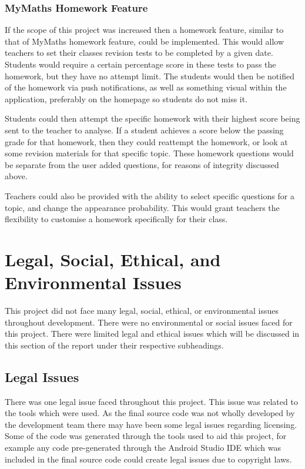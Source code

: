 \documentclass{article}
\begin{document}
\subsubsection{MyMaths Homework Feature}

If the scope of this project was increased then a homework feature, similar to that of MyMaths homework feature, could be implemented. This would allow teachers to set their classes revision tests to be completed by a given date. Students would require a certain percentage score in these tests to pass the homework, but they have no attempt limit. The students would then be notified of the homework via push notifications, as well as something visual within the application, preferably on the homepage so students do not miss it. \par

Students could then attempt the specific homework with their highest score being sent to the teacher to analyse. If a student achieves a score below the passing grade for that homework, then they could reattempt the homework, or look at some revision materials for that specific topic. These homework questions would be separate from the user added questions, for reasons of integrity discussed above. \par

Teachers could also be provided with the ability to select specific questions for a topic, and change the appearance probability. This would grant teachers the flexibility to customise a homework specifically for their class. \par

\section{Legal, Social, Ethical, and Environmental Issues}
\label{section:issues}

This project did not face many legal, social, ethical, or environmental issues throughout development. There were no environmental or social issues faced for this project. There were limited legal and ethical issues which will be discussed in this section of the report under their respective subheadings. 

\subsection{Legal Issues}

There was one legal issue faced throughout this project. This issue was related to the tools which were used. As the final source code was not wholly developed by the development team there may have been some legal issues regarding licensing. Some of the code was generated through the tools used to aid this project, for example any code pre-generated through the Android Studio IDE which was included in the final source code could create legal issues due to copyright laws. \par
\end{document}
